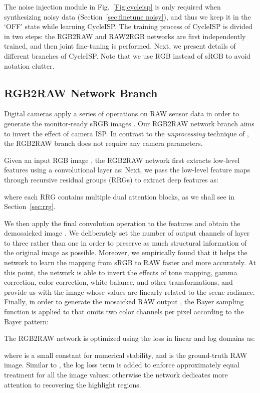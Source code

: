 \documentclass[10pt,twocolumn,letterpaper]{article}
\begin{document}
The noise injection module in Fig.~\ref{Fig:cycleisp} is only required when synthesizing noisy data (Section~\ref{sec:finetune noisy}), and thus we keep it in the `OFF' state while learning CycleISP. 
The training process of CycleISP is divided in two steps: the RGB2RAW and RAW2RGB networks are first independently trained, and then joint fine-tuning is performed. 
Next, we present details of different branches of CycleISP. 
Note that we use RGB instead of sRGB to avoid notation clutter.

\subsection{RGB2RAW Network Branch}
Digital cameras apply a series of operations on RAW sensor data in order to generate the monitor-ready sRGB images \cite{Ramanath2005}. 
Our RGB2RAW network branch aims to invert the effect of camera ISP. 
In contrast to the \emph{unprocessing} technique of \cite{Brooks2019}, the RGB2RAW branch does not require any camera parameters.  

Given an input RGB image , the RGB2RAW network first extracts low-level features  using a convolutional layer  as:  
Next, we pass the low-level feature maps  through  recursive residual groups (RRGs) to extract deep features  as:

where each RRG contains multiple dual attention blocks, as we shall see in Section~\ref{sec:rrg}. 

We then apply the final convolution operation  to the features  and obtain the demosaicked image .
We deliberately set the number of output channels of  layer to three rather than one in order to preserve as much structural information of the original image as possible. 
Moreover, we empirically found that it helps the network to learn the mapping from sRGB to RAW faster and more accurately. 
At this point, the network is able to invert the effects of tone mapping, gamma correction, color correction, white balance, and other transformations, and provide us with the image  whose values are linearly related to the scene radiance. 
Finally, in order to generate the mosaicked RAW output , the Bayer sampling function  is applied to  that omits two color channels per pixel according to the  Bayer pattern: 


The RGB2RAW network is optimized using the  loss in linear and log domains as:

where  is a small constant for numerical stability, and  is the ground-truth RAW image. 
Similar to \cite{eilertsen2017hdr}, the log loss term is added to enforce approximately equal treatment for all the image values; otherwise the network dedicates more attention to recovering the highlight regions.
\end{document}
